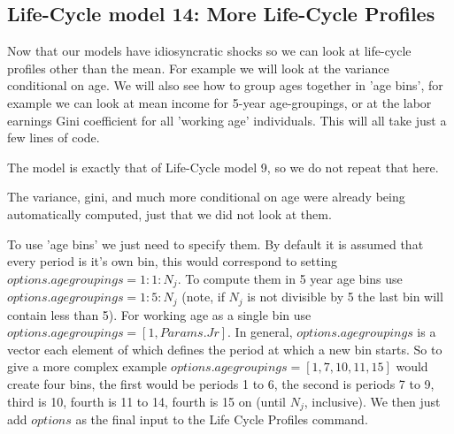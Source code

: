 \subsection{Life-Cycle model 14: More Life-Cycle Profiles}
Now that our models have idiosyncratic shocks so we can look at life-cycle profiles other than the mean. For example we will look at the variance conditional on age. We will also see how to group ages together in 'age bins', for example we can look at mean income for 5-year age-groupings, or at the labor earnings Gini coefficient for all 'working age' individuals. This will all take just a few lines of code.

The model is exactly that of Life-Cycle model 9, so we do not repeat that here.

The variance, gini, and much more conditional on age were already being automatically computed, just that we did not look at them.

To use 'age bins' we just need to specify them. By default it is assumed that every period is it's own bin, this would correspond to setting $options.agegroupings=1:1:N_j$. To compute them in 5 year age bins use $options.agegroupings=1:5:N_j$ (note, if $N_j$ is not divisible by 5 the last bin will contain less than 5). For working age as a single bin use $options.agegroupings=[1,Params.Jr]$. In general, $options.agegroupings$ is a vector each element of which defines the period at which a new bin starts. So to give a more complex example $options.agegroupings=[1,7,10,11,15]$ would create four bins, the first would be periods 1 to 6, the second is periods 7 to 9, third is 10, fourth is 11 to 14, fourth is 15 on (until $N_j$, inclusive). We then just add $options$ as the final input to the Life Cycle Profiles command.




